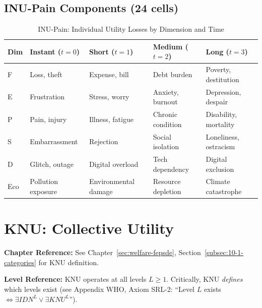 \subsection{INU-Pain Components (24 cells)}

\begin{table}[htbp]
\centering
\caption{INU-Pain: Individual Utility Losses by Dimension and Time}
\label{tab:app-c-inu-pain}
\small
\renewcommand{\arraystretch}{1.2}
\begin{tabular}{@{}lp{2.8cm}p{2.8cm}p{2.8cm}p{2.8cm}@{}}
\toprule
\textbf{Dim} & \textbf{Instant ($t=0$)} & \textbf{Short ($t=1$)} & \textbf{Medium ($t=2$)} & \textbf{Long ($t=3$)} \\
\midrule
F & Loss, theft & Expense, bill & Debt burden & Poverty, destitution \\
E & Frustration & Stress, worry & Anxiety, burnout & Depression, despair \\
P & Pain, injury & Illness, fatigue & Chronic condition & Disability, mortality \\
S & Embarrassment & Rejection & Social isolation & Loneliness, ostracism \\
D & Glitch, outage & Digital overload & Tech dependency & Digital exclusion \\
Eco & Pollution exposure & Environmental damage & Resource depletion & Climate catastrophe \\
\bottomrule
\end{tabular}
\end{table}

\section{KNU: Collective Utility}
\label{sec:app-c-knu}

\begin{cross-reference}
\textbf{Chapter Reference:} See Chapter~\ref{sec:welfare-fepsde}, 
Section~\ref{subsec:10-1-categories} for KNU definition.

\textbf{Level Reference:} KNU operates at all levels $L \geq 1$. Critically, 
KNU \textit{defines} which levels exist (see Appendix WHO, Axiom SRL-2: 
``Level $L$ exists $\iff \exists IDN^L \lor \exists KNU^L$'').
\end{cross-reference}

